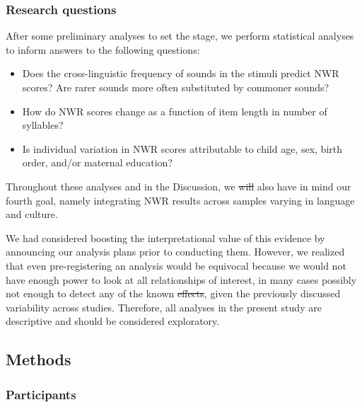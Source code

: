 \documentclass[ %
american, %
,man,floatsintext]{apa6} %
\providecommand{\tightlist}{%
	\setlength{\itemsep}{0pt}\setlength{\parskip}{0pt}} %
\providecommand{\DIFaddtex}[1]{{\protect\color{blue}\uwave{#1}}} %
\providecommand{\DIFdeltex}[1]{{\protect\color{red}\sout{#1}}}                      %
\providecommand{\DIFaddbegin}{} %
\providecommand{\DIFaddend}{} %
\providecommand{\DIFdelbegin}{} %
\providecommand{\DIFdelend}{} %
\providecommand{\DIFadd}[1]{\texorpdfstring{\DIFaddtex{#1}}{#1}} %
\providecommand{\DIFdel}[1]{\texorpdfstring{\DIFdeltex{#1}}{}} %
\newcommand{\DIFscaledelfig}{0.5}
\newlength{\DIFdelgraphicswidth} %
\newlength{\DIFdelgraphicsheight} %
\newcommand{\DIFaddincludegraphics}[2][]{{\color{blue}\fbox{\DIFOincludegraphics[#1]{#2}}}} %
\newcommand{\DIFdelincludegraphics}[2][]{%
	\sbox{\DIFdelgraphicsbox}{\DIFOincludegraphics[#1]{#2}}%
	\settoboxwidth{\DIFdelgraphicswidth}{\DIFdelgraphicsbox} %
	\settoboxtotalheight{\DIFdelgraphicsheight}{\DIFdelgraphicsbox} %
	\scalebox{\DIFscaledelfig}{%
		\parbox[b]{\DIFdelgraphicswidth}{\usebox{\DIFdelgraphicsbox}\\[-\baselineskip] \rule{\DIFdelgraphicswidth}{0em}}\llap{\resizebox{\DIFdelgraphicswidth}{\DIFdelgraphicsheight}{%
				\setlength{\unitlength}{\DIFdelgraphicswidth}%
				\begin{picture}(1,1)%
				\thicklines\linethickness{2pt} %
				{\color[rgb]{1,0,0}\put(0,0){\framebox(1,1){}}}%
				{\color[rgb]{1,0,0}\put(0,0){\line( 1,1){1}}}%
				{\color[rgb]{1,0,0}\put(0,1){\line(1,-1){1}}}%
				\end{picture}%
			}\hspace*{3pt}}} %
} %
\DeclareRobustCommand{\DIFaddbegin}{\DIFOaddbegin \let\includegraphics\DIFaddincludegraphics} %
\DeclareRobustCommand{\DIFaddend}{\DIFOaddend \let\includegraphics\DIFOincludegraphics} %
\DeclareRobustCommand{\DIFdelbegin}{\DIFOdelbegin \let\includegraphics\DIFdelincludegraphics} %
\DeclareRobustCommand{\DIFdelend}{\DIFOaddend \let\includegraphics\DIFOincludegraphics} %
\begin{document}
\DIFdelend \hypertarget{research-questions}{%
	\subsubsection{Research questions}\label{research-questions}}

After some preliminary analyses to set the stage, we perform statistical analyses to inform answers to the following questions:

\begin{itemize}
	\tightlist
	\item
	Does the cross-linguistic frequency of sounds in the stimuli predict NWR scores? Are rarer sounds more often substituted by commoner sounds?
	\item
	How do NWR scores change as a function of item length in number of syllables?
	\item
	Is individual variation in NWR scores attributable to child age, sex, birth order, and/or maternal education?
\end{itemize}

Throughout these analyses and in the Discussion, we \DIFdelbegin \DIFdel{will }\DIFdelend also have in mind our fourth goal, namely integrating NWR results across samples varying in language and culture.

We had considered boosting the interpretational value of this evidence by announcing our analysis plans prior to conducting them. However, we realized that even pre-registering an analysis would be equivocal because we would not have enough power to look at all relationships of interest, in many cases possibly not enough to detect any of the known \DIFdelbegin \DIFdel{effects}\DIFdelend \DIFaddbegin \DIFadd{associations}\DIFaddend , given the previously discussed variability across studies. Therefore, all analyses in the present study are descriptive and should be considered exploratory.

\hypertarget{methods}{%
	\subsection{Methods}\label{methods}}

\DIFaddbegin \hypertarget{participants}{%
	\subsubsection{Participants}\label{participants}}
\end{document}
